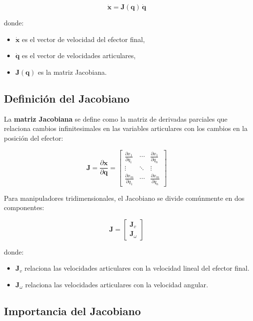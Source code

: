\[
\dot{\boldsymbol{x}} = \mathbf{J}(\boldsymbol{q}) \, \dot{\boldsymbol{q}}
\]

donde:
\begin{itemize}
	\item $\dot{\boldsymbol{x}}$ es el vector de velocidad del efector final,
	\item $\dot{\boldsymbol{q}}$ es el vector de velocidades articulares,
	\item $\mathbf{J}(\boldsymbol{q})$ es la matriz Jacobiana.
\end{itemize}

\subsection*{Definición del Jacobiano}

La \textbf{matriz Jacobiana} se define como la matriz de derivadas parciales que relaciona cambios infinitesimales en las variables articulares con los cambios en la posición del efector:

\[
\mathbf{J} = \frac{\partial \boldsymbol{x}}{\partial \boldsymbol{q}} =
\begin{bmatrix}
	\frac{\partial x_1}{\partial q_1} & \cdots & \frac{\partial x_1}{\partial q_n} \\
	\vdots & \ddots & \vdots \\
	\frac{\partial x_m}{\partial q_1} & \cdots & \frac{\partial x_m}{\partial q_n}
\end{bmatrix}
\]

Para manipuladores tridimensionales, el Jacobiano se divide comúnmente en dos componentes:

\[
\mathbf{J} =
\begin{bmatrix}
	\mathbf{J}_v \\
	\mathbf{J}_\omega
\end{bmatrix}
\]

donde:
\begin{itemize}
	\item $\mathbf{J}_v$ relaciona las velocidades articulares con la velocidad lineal del efector final.
	\item $\mathbf{J}_\omega$ relaciona las velocidades articulares con la velocidad angular.
\end{itemize}

\subsection*{Importancia del Jacobiano}

